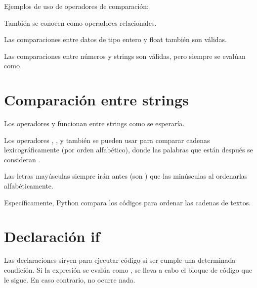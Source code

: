 Ejemplos de uso de operadores de comparación:


También se conocen como operadores relacionales.

Las comparaciones entre datos de tipo entero y float también son válidas.


Las comparaciones entre números y strings son válidas, pero siempre se evalúan como .


\section{Comparación entre strings}

Los operadores \ttt{==} y \ttt{!=} funcionan entre strings como se esperaría.


Los operadores \ttt{>}, \ttt{<}, \ttt{>=} y \ttt{<=} también se pueden usar para comparar cadenas lexicográficamente (por orden alfabético), donde las palabras que están después se consideran .


Las letras mayúsculas siempre irán antes (son ) que las minúsculas al ordenarlas alfabéticamente.


Específicamente, Python compara los códigos  para ordenar las cadenas de textos.

\section{Declaración if}

Las declaraciones  sirven para ejecutar código si ser cumple una determinada condición.
Si la expresión se evalúa como , se lleva a cabo el bloque de código que le sigue.
En caso contrario, no ocurre nada.

